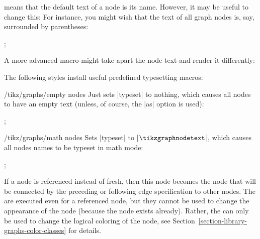 \begin{itemize}
        means that the default text of a node is its name. However, it may be
        useful to change this: For instance, you might wish that the text of
        all graph nodes is, say, surrounded by parentheses:
\begin{codeexample}[preamble={\usetikzlibrary{graphs}}]
\tikz {};
\end{codeexample}
        A more advanced macro might take apart the node text and render it
        differently:
        The following styles install useful predefined typesetting macros:
        \begin{key}{/tikz/graphs/empty nodes}
            Just sets |typeset| to nothing, which causes all nodes to have an
            empty text (unless, of course, the |as| option is used):
\begin{codeexample}[preamble={\usetikzlibrary{graphs}}]
\tikz {};
\end{codeexample}
        \end{key}
        \begin{key}{/tikz/graphs/math nodes}
            Sets |typeset| to |$\tikzgraphnodetext$|, which causes all nodes
            names to be typeset in math mode:
\begin{codeexample}[preamble={\usetikzlibrary{graphs}}]
\tikz {};
\end{codeexample}
        \end{key}
\end{itemize}

If a node is referenced instead of fresh, then this node becomes the node that
will be connected by the preceding or following edge specification to other
nodes. The  are executed even for a referenced node, but they
cannot be used to change the appearance of the node (because the node exists
already). Rather, the  can only be used to change the logical
coloring of the node, see Section~\ref{section-library-graphs-color-classes}
for details.

